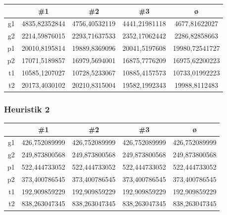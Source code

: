 \begin{center}
    \begin{tabular}{|r|S[table-format=5.8]|S[table-format=5.8]|S[table-format=5.8]|S[table-format=5.8]|}
        \hline
         & {\#1} & {\#2} & {\#3} & ø \\\hline
        g1 & 4835,82352844 & 4756,40532119 & 4441,21981118 & 4677,81622027  \\\hline
        g2 & 2214,59876015 & 2293,71637533 & 2352,17062442 & 2286,82858663  \\\hline
        p1 & 20010,8195814 & 19889,8369096 & 20041,5197608 & 19980,72541727 \\\hline
        p2 & 17071,5189857 & 16979,5694001 & 16875,7776209 & 16975,62200223 \\\hline
        t1 & 10585,1207027 & 10728,5233067 & 10885,4157573 & 10733,01992223 \\\hline
        t2 & 20173,4030102 & 20210,8315004 & 19582,1992343 & 19988,8112483  \\\hline
    \end{tabular}
\end{center}

\subsubsection{Heuristik 2} \label{subsubsec:app_heuristik2_qualität}

\begin{center}
    \begin{tabular}{|r|S[table-format=3.9]|S[table-format=3.9]|S[table-format=3.9]|S[table-format=3.9]|}
        \hline
         & {\#1} & {\#2} & {\#3} & ø \\\hline
        g1 & 426,752089999 & 426,752089999 & 426,752089999 & 426,752089999 \\\hline
        g2 & 249,873800568 & 249,873800568 & 249,873800568 & 249,873800568 \\\hline
        p1 & 522,444733052 & 522,444733052 & 522,444733052 & 522,444733052 \\\hline
        p2 & 373,400786545 & 373,400786545 & 373,400786545 & 373,400786545 \\\hline
        t1 & 192,909859229 & 192,909859229 & 192,909859229 & 192,909859229 \\\hline
        t2 & 838,263047345 & 838,263047345 & 838,263047345 & 838,263047345 \\\hline
    \end{tabular}
\end{center}

